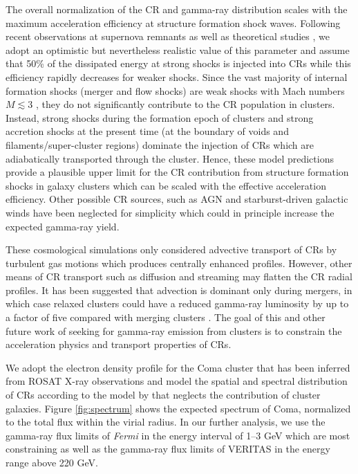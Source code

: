 \documentclass[12pt,manuscript]{aastex}
\begin{document}
The overall normalization of the CR and gamma-ray distribution scales with the maximum acceleration efficiency at structure formation shock waves. Following recent observations at supernova remnants \citep{article:Helder_etal:2009} as well as theoretical studies \citep{article:KangJones:2005}, we adopt an optimistic but nevertheless realistic value of this parameter and assume that 50\% of the dissipated energy at strong shocks is injected into CRs while this efficiency rapidly decreases for weaker shocks. Since the vast majority of internal formation shocks (merger and flow shocks) are weak shocks with Mach numbers $M\lesssim3$ \citep[e.g.,][]{article:Ryu_etal:2003}, they do not significantly contribute to the CR population in clusters. Instead, strong shocks during the formation epoch of clusters and strong accretion shocks at the present time (at the boundary of voids and filaments/super-cluster regions) dominate the injection of CRs which are adiabatically transported through the cluster. Hence, these model predictions provide a plausible upper limit for the CR contribution from structure formation shocks in galaxy clusters which can be scaled with the effective acceleration efficiency. Other possible CR sources, such as AGN and starburst-driven galactic winds have been neglected for simplicity which could in principle increase the expected gamma-ray yield.

These cosmological simulations only considered advective transport of CRs by turbulent gas motions which produces centrally enhanced profiles.  However, other means of CR transport such as diffusion and streaming may flatten the CR radial profiles. It has been suggested that advection is dominant only during mergers, in which case relaxed clusters could have a reduced gamma-ray luminosity by up to a factor of five compared with merging clusters \citep{article:EnsslinPfrommerMiniatiSubramanian:2011}. The goal of this and other future work of seeking for gamma-ray emission from clusters is to constrain the acceleration physics and transport properties of CRs.

We adopt the electron density profile for the Coma cluster that has been inferred from ROSAT X-ray observations \citep{article:BrielHenryBohringer:1992} and model the spatial and spectral distribution of CRs according to the model by \citet{article:PinzkePfrommer:2010} that neglects the contribution of cluster galaxies. Figure \ref{fig:spectrum} shows the expected spectrum of Coma, normalized to the total flux within the virial radius. In our further analysis, we use the gamma-ray flux limits of {\em Fermi} in the energy interval of 1--3 GeV which are most constraining as well as the gamma-ray flux limits of VERITAS in the energy range above 220 GeV.
\end{document}

